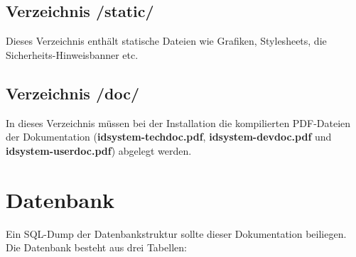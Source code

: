 \subsection{Verzeichnis /static/}
Dieses Verzeichnis enthält statische Dateien wie Grafiken, Stylesheets, die Sicherheits-Hinweisbanner etc.

\subsection{Verzeichnis /doc/}
In dieses Verzeichnis müssen bei der Installation die kompilierten PDF-Dateien der Dokumentation
(\textbf{idsystem-techdoc.pdf}, \textbf{idsystem-devdoc.pdf} und \textbf{idsystem-userdoc.pdf}) abgelegt werden.

\newpage
\section{Datenbank}
Ein SQL-Dump der Datenbankstruktur sollte dieser Dokumentation beiliegen.
Die Datenbank besteht aus drei Tabellen:

